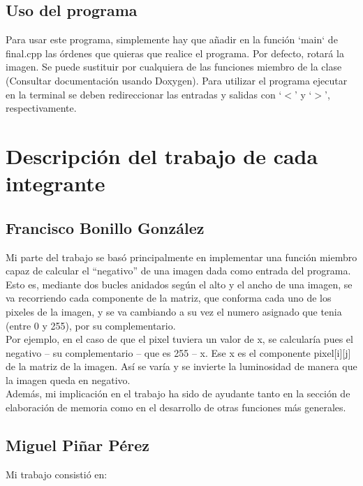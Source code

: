 \documentclass[a4paper, 11pt, spanish]{article}
\begin{document}
\subsection{Uso del programa}

Para usar este programa, simplemente hay que añadir en la función `main` de final.cpp las órdenes que quieras que realice el programa. Por defecto, rotará la imagen. Se puede sustituir por cualquiera de las funciones miembro de la clase (Consultar documentación usando Doxygen). Para utilizar el programa ejecutar en la terminal se deben redireccionar las entradas y salidas con `$ < $' y `$ > $', respectivamente.

\section{Descripción del trabajo de cada integrante}

\subsection{Francisco Bonillo González}

Mi parte del trabajo se basó principalmente en implementar una función miembro capaz de calcular el “negativo” de una imagen dada como entrada del programa.
\\

Esto es, mediante dos bucles anidados según el alto y el ancho de una imagen, se va recorriendo cada componente de la matriz, que conforma cada uno de los pixeles de la imagen, y se va cambiando a su vez el numero asignado que tenia (entre 0 y 255), por su complementario.
\\

Por ejemplo, en el caso de que el pixel tuviera un valor de x, se calcularía pues el negativo – su complementario – que es 255 – x. Ese x es el componente pixel[i][j] de la matriz de la imagen. Así se varía y se invierte la luminosidad de manera que la imagen queda en negativo.
\\

Además, mi implicación en el trabajo ha sido de ayudante tanto en la sección de elaboración de memoria como en el desarrollo de otras funciones más generales.

\subsection{Miguel Piñar Pérez}

Mi trabajo consistió en:
\end{document}
